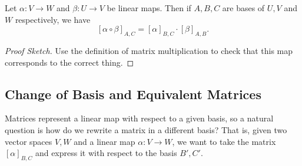 \documentclass[a4paper]{scrartcl}
\begin{document}
\begin{lemma}
    Let $\alpha: V \rightarrow W$ and $\beta: U \rightarrow V$ be linear maps. Then if $A, B, C$ are bases of $U, V$ and $W$ respectively, we have 
    $$
    [\alpha \circ \beta]_{A, C} = [\alpha]_{B, C} \cdot [\beta]_{A, B}.
    $$
\end{lemma}
\begin{proof}[Proof Sketch]
    Use the definition of matrix multiplication to check that this map corresponds to the correct thing.
\end{proof}



    


\subsection{Change of Basis and Equivalent Matrices}

Matrices represent a linear map with respect to a given basis, so a natural question is how do we rewrite a matrix in a different basis? That is, 
given two vector spaces $V, W$ and a linear map $\alpha: V \rightarrow W$, we want to take the matrix $[\alpha]_{B, C}$ and express it with respect to the basis $B', C'$. 
\end{document}
